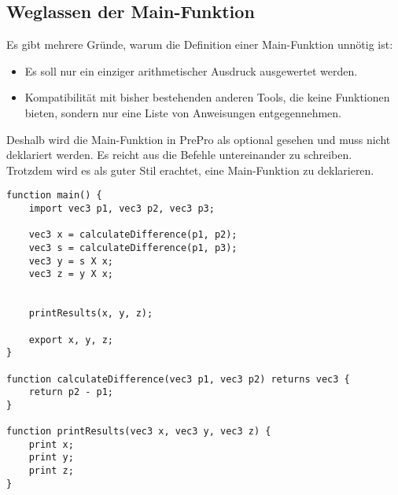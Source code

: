 \subsection{Weglassen der Main-Funktion}
Es gibt mehrere Gründe, warum die Definition einer Main-Funktion unnötig ist:
\begin{itemize}
\item Es soll nur ein einziger arithmetischer Ausdruck ausgewertet werden.
\item Kompatibilität mit bisher bestehenden anderen Tools, die keine Funktionen bieten, sondern nur eine Liste von Anweisungen entgegennehmen.
\end{itemize}
Deshalb wird die Main-Funktion in \ac{PrePro} als optional gesehen und muss nicht deklariert werden.
Es reicht aus die Befehle untereinander zu schreiben.\\
Trotzdem wird es als guter Stil erachtet, eine Main-Funktion zu deklarieren.

\begin{lstlisting}[language=prepro, label={lst:Bsp_Funktionen}, caption={Beispiel Funktionen}, captionpos=b]
function main() {
	import vec3 p1, vec3 p2, vec3 p3;

	vec3 x = calculateDifference(p1, p2);
	vec3 s = calculateDifference(p1, p3);
	vec3 y = s X x;
	vec3 z = y X x;


	printResults(x, y, z);

	export x, y, z;
}

function calculateDifference(vec3 p1, vec3 p2) returns vec3 {
	return p2 - p1;
}

function printResults(vec3 x, vec3 y, vec3 z) {
	print x;
	print y;
	print z;
}
\end{lstlisting}

